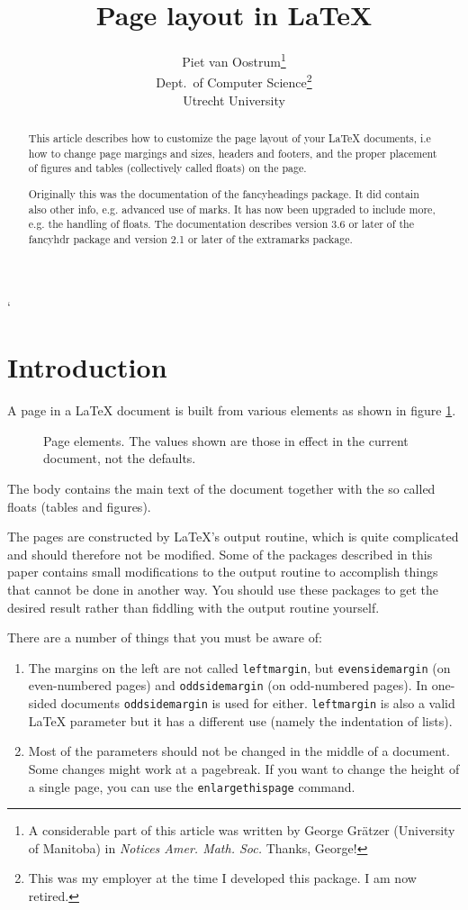 `\documentclass[a4paper]{article}
\title{Page layout in \LaTeX}
\author{Piet van Oostrum\thanks{A considerable part of this article was
    written by  George
    Gr\"atzer (University of Manitoba) in \emph{Notices Amer. Math. Soc.}
    Thanks, George!}\\
  Dept.\ of Computer Science\thanks{This was my employer at the time I developed this package. I am now retired.}\\
  Utrecht University}
\def\latex/{\protect\LaTeX{}}
\newcommand{\bs}{\symbol{'134}}
\newcommand{\Cmd}[1]{\texttt{\def\{{\char`\{}\def\}{\char`\}}\bs#1}}
\begin{document}
\maketitle
\begin{abstract}
  This article describes how to customize the page layout of your LaTeX
  documents, i.e how to change page margings and sizes, 
  headers and footers, and the
  proper placement of figures and tables (collectively called floats) on
  the page. 

  Originally this was the documentation of the  \textsf{fancyheadings}
  package. It did contain also other info, e.g. advanced use of marks.
  It has now been upgraded to include more, e.g. the handling of floats.
  The documentation describes version 3.6 or later of the \textsf{fancyhdr} package 
  and version 2.1 or later of the \textsf{extramarks} package.

\end{abstract}
\tableofcontents


\section{Introduction}
\label{sec:intro}

A page in a \LaTeX{} document is built from various elements as shown in
figure \ref{fig:layout}. 
\begin{figure}[htbp]
  \begin{center}
    \leavevmode
    \layout
    \vspace{3cm}
    \caption{Page elements. The values shown are those in effect in the current document, not the defaults.}
    \label{fig:layout}
  \end{center}
\end{figure}
\thispagestyle{plain}
The body contains the main text of the document
together with the so called floats (tables and figures). 

The pages are constructed by \LaTeX's output routine, which is quite
complicated and should therefore not be modified. Some of the packages
described in this paper contains small modifications to the output routine
to accomplish things that cannot be done in another way. You should use
these packages to get the desired result rather than fiddling with the
output routine yourself.

There are a number of things that you must be aware of:
\begin{enumerate}
\item The margins on the left are not called \Cmd{leftmargin}, but
  \Cmd{evensidemargin} (on even-numbered pages) and \Cmd{oddsidemargin}
  (on odd-numbered pages). In one-sided documents 
  \Cmd{oddsidemargin} is used for either.  \Cmd{leftmargin} is also a valid
  \latex/ parameter but it has a different use (namely the indentation of
  lists). 
\item Most of the parameters should not be changed in the middle of a
  document. Some changes might work at a pagebreak. If you want to change
  the height of a single page, you can use the \Cmd{enlargethispage}
  command. 
\end{enumerate}
\end{document}
